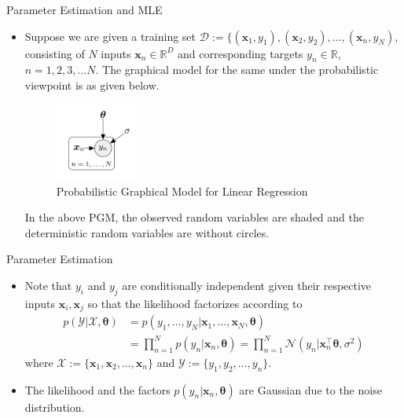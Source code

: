 \documentclass{beamer}
\begin{document}
\begin{frame}{Parameter Estimation and MLE}
\begin{itemize}[<+->]
\item  Suppose we are given a training set $\mathcal{D} := \{ (\boldsymbol{x}_1, y_1), (\boldsymbol{x}_2, y_2), \dots, (\boldsymbol{x}_n, y_N)$, consisting of $N$ inputs $\boldsymbol{x}_n \in \mathbb{R}^{D}$ and corresponding targets $y_n \in \mathbb{R}$, $n = 1, 2, 3, \dots N$. The graphical model for the same under the probabilistic viewpoint is as given below.
\begin{figure}[htp]
    \centering
    \includegraphics[width=2.7cm]{figures/graphicalmodel.png}
    \caption{Probabilistic Graphical Model for Linear Regression}
    \label{fig:pgmlr}
\end{figure}

In the above PGM, the observed random variables are shaded and the deterministic random variables are without circles.
\end{itemize}
\end{frame}


\begin{frame}{Parameter Estimation}
\begin{itemize}[<+->]
\item  Note that $y_i$ and $y_j$ are conditionally independent given their respective inputs $\boldsymbol{x}_i, \boldsymbol{x}_j$ so that the likelihood factorizes according to 
\begin{equation*}
\begin{aligned}
p(\mathcal{Y} | \mathcal{X}, \boldsymbol{\theta}) &=p\left(y_{1}, \ldots, y_{N} | \boldsymbol{x}_{1}, \ldots, \boldsymbol{x}_{N}, \boldsymbol{\theta}\right) \\
&=\prod_{n=1}^{N} p\left(y_{n} | \boldsymbol{x}_{n}, \boldsymbol{\theta}\right)=\prod_{n=1}^{N} \mathcal{N}\left(y_{n} | \boldsymbol{x}_{n}^{\top} \boldsymbol{\theta}, \sigma^{2}\right)
\end{aligned}
\end{equation*}
where $\mathcal{X}:= \{ \boldsymbol{x}_1, \boldsymbol{x}_2, \dots, \boldsymbol{x}_n \}$ and   $\mathcal{Y}:= \{ y_1, y_2, \dots, y_n \}$.
\item The likelihood and the factors $p(y_n | \boldsymbol{x}_n, \boldsymbol{\theta})$ are Gaussian due to the noise distribution.
\end{itemize}
\end{frame}
\end{document}

